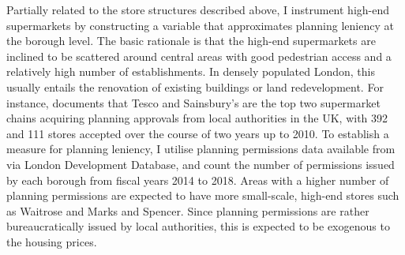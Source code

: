 \documentclass{article}
\begin{document}
Partially related to the store structures described above, I instrument high-end supermarkets by constructing a variable that approximates planning leniency at the borough level. The basic rationale is that the high-end supermarkets are inclined to be scattered around central areas with good pedestrian access and a relatively high number of establishments. In densely populated London, this usually entails the renovation of existing buildings or land redevelopment. For instance, \citet{Hawkes2010BigDay} documents that Tesco and Sainsbury's are the top two supermarket chains acquiring planning approvals from local authorities in the UK, with 392 and 111 stores accepted over the course of two years up to 2010. To establish a measure for planning leniency, I utilise planning permissions data available from \citet{GreaterLondonAuthority2017PlanningDatabase} via London Development Database, and count the number of permissions issued by each borough from fiscal years 2014 to 2018. Areas with a higher number of planning permissions are expected to have more small-scale, high-end stores such as Waitrose and Marks and Spencer. Since planning permissions are rather bureaucratically issued by local authorities, this is expected to be exogenous to the housing prices.
\end{document}
